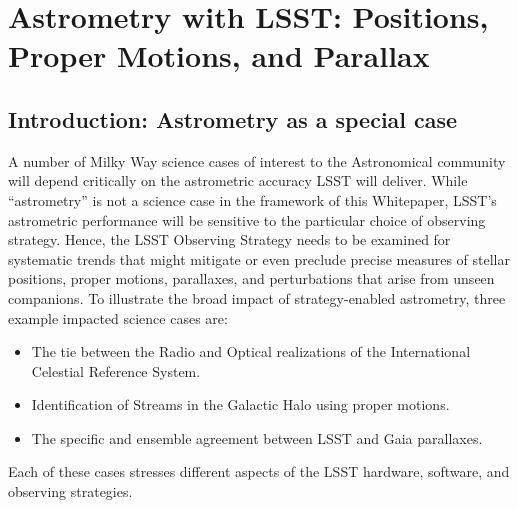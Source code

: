 \section{Astrometry with LSST: Positions, Proper Motions, and Parallax}
\def\secname{MW_Astrometry}\label{sec:\secname} %


\subsection{Introduction: Astrometry as a special case}
\label{sec:keyword:MW_Astrometry_intro}

A number of Milky Way science cases of interest to the Astronomical
community will depend critically on the astrometric accuracy LSST will
deliver. While ``astrometry'' is not a science case in the framework
of this Whitepaper, LSST's astrometric performance will be sensitive
to the particular choice of observing strategy.
Hence, the LSST Observing Strategy needs to be examined for systematic
trends that might mitigate or even preclude precise measures of
stellar positions, proper motions, parallaxes, and perturbations that
arise from unseen companions. To illustrate the broad impact of
strategy-enabled astrometry, three example impacted science cases are:
\begin{itemize}
\item The tie between the Radio and Optical realizations of the
International Celestial Reference System.
\item Identification of Streams in the Galactic Halo using proper motions.
\item The specific and ensemble agreement between LSST and Gaia parallaxes.
\end{itemize}
Each of these cases stresses different aspects of the LSST hardware, software,
and observing strategies.

